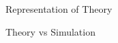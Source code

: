 \documentclass[journal,12pt,twocolumn]{IEEEtran}
\begin{document}
\begin{figure}[H]
    \centering
    \caption{Representation of Theory}
    \label{Pie chart}
\end{figure}

\begin{figure}[H]
    \centering
    \caption{Theory vs Simulation}
    \label{Bar Chart}
\end{figure}
\end{document}
